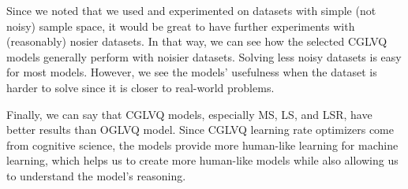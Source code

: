 Since we noted that we used and experimented on datasets with simple (not noisy) sample space, it would be great to have further experiments with (reasonably) nosier datasets. In that way, we can see how the selected CGLVQ models generally perform with noisier datasets. Solving less noisy datasets is easy for most models. However, we see the models’ usefulness when the dataset is harder to solve since it is closer to real-world problems.

Finally, we can say that CGLVQ models, especially MS, LS, and LSR, have better results than OGLVQ model. Since CGLVQ learning rate optimizers come from cognitive science, the models provide more human-like learning for machine learning, which helps us to create more human-like models while also allowing us to understand the model’s reasoning.
